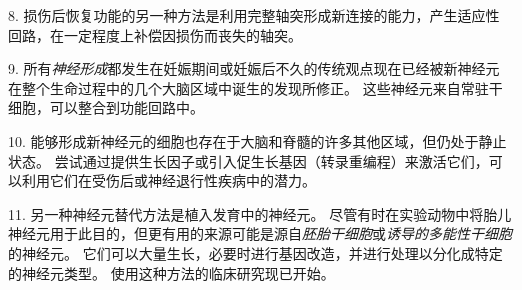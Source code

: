 8. 损伤后恢复功能的另一种方法是利用完整轴突形成新连接的能力，产生适应性回路，在一定程度上补偿因损伤而丧失的轴突。 


9. 所有\textit{神经形成}都发生在妊娠期间或妊娠后不久的传统观点现在已经被新神经元在整个生命过程中的几个大脑区域中诞生的发现所修正。
这些神经元来自常驻干细胞，可以整合到功能回路中。


10. 能够形成新神经元的细胞也存在于大脑和脊髓的许多其他区域，但仍处于静止状态。
尝试通过提供生长因子或引入促生长基因（转录重编程）来激活它们，可以利用它们在受伤后或神经退行性疾病中的潜力。


11. 另一种神经元替代方法是植入发育中的神经元。
尽管有时在实验动物中将胎儿神经元用于此目的，但更有用的来源可能是源自\textit{胚胎干细胞}或\textit{诱导的多能性干细胞}的神经元。
它们可以大量生长，必要时进行基因改造，并进行处理以分化成特定的神经元类型。
使用这种方法的临床研究现已开始。



